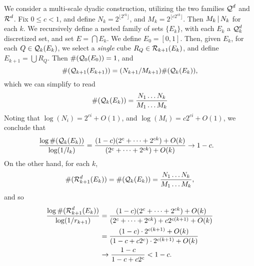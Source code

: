 \begin{example}
	We consider a multi-scale dyadic construction, utilizing the two families $\operatorname{\mathcal{Q}}^d$ and $\operatorname{\mathcal{R}}^d$. Fix $0 \leq c < 1$, and define $N_k = 2^{\lfloor 2^{ck} \rfloor}$, and $M_k = 2^{\lfloor c 2^{ck} \rfloor}$. Then $M_k \operatorname{\mid} N_k$ for each $k$. We recursively define a nested family of sets $\{ E_k \}$, with each $E_k$ a $\operatorname{\mathcal{Q}}_k^d$ discretized set, and set $E = \bigcap E_k$. We define $E_0 = [0,1]$. Then, given $E_k$, for each $Q \in \operatorname{\mathcal{Q}}_k(E_k)$, we select a \emph{single} cube $R_Q \in \operatorname{\mathcal{R}}_{k+1}(E_k)$, and define $E_{k+1} = \bigcup R_Q$. Then $\#(\operatorname{\mathcal{Q}}_0(E_0)) = 1$, and
	\[ \#(\operatorname{\mathcal{Q}}_{k+1}(E_{k+1})) = (N_{k+1}/M_{k+1}) \#(\operatorname{\mathcal{Q}}_k(E_k)), \]
	which we can simplify to read
	\begin{equation} \label{equation12623} \#(\operatorname{\mathcal{Q}}_k(E_k)) = \frac{N_1 \dots N_k}{M_1 \dots M_k} \end{equation}
	Noting that $\log(N_i) = 2^{ci} + O(1)$, and $\log(M_i) = c2^{ci} + O(1)$, we conclude that
	\begin{align*}
		\frac{\log \#(\operatorname{\mathcal{Q}}_k(E_k))}{\log(1/l_k)} &= \frac{(1-c)(2^c + \dots + 2^{ck}) + O(k)}{(2^c + \dots + 2^{ck}) + O(k)} \to 1-c.
	\end{align*}
	On the other hand, for each $k$,
	\[ \#(\operatorname{\mathcal{R}}_{k+1}^d(E_k)) = \#(\operatorname{\mathcal{Q}}_k(E_k)) = \frac{N_1 \dots N_k}{M_1 \dots M_k}, \]
	and so
	\begin{align*}
		\frac{\log \#(\operatorname{\mathcal{R}}_{k+1}^d(E_k))}{\log(1/r_{k+1})} &= \frac{(1-c)(2^c + \dots + 2^{ck}) + O(k)}{(2^c + \dots + 2^{ck}) + c2^{c(k+1)} + O(k)} \\
		&= \frac{(1-c) \cdot 2^{c(k+1)} + O(k)}{(1 - c + c 2^c) \cdot 2^{c(k+1)} + O(k)}\\
		&\to \frac{1 - c}{1 - c + c2^c} < 1 - c.
	\end{align*}
%
%

\end{example}
